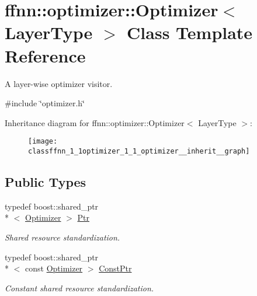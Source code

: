 \hypertarget{classffnn_1_1optimizer_1_1_optimizer}{\section{ffnn\-:\-:optimizer\-:\-:Optimizer$<$ Layer\-Type $>$ Class Template Reference}
\label{classffnn_1_1optimizer_1_1_optimizer}
}


A layer-\/wise optimizer visitor.  




{\ttfamily \#include \char`\"{}optimizer.\-h\char`\"{}}



Inheritance diagram for ffnn\-:\-:optimizer\-:\-:Optimizer$<$ Layer\-Type $>$\-:\nopagebreak
\begin{figure}[H]
\begin{center}
\leavevmode
\texttt{[image: classffnn\_1\_1optimizer\_1\_1\_optimizer\_\_inherit\_\_graph]}
\end{center}
\end{figure}
\subsection*{Public Types}
\begin{DoxyCompactItemize}
\item 
typedef boost\-::shared\-\_\-ptr\\*
$<$ \hyperlink{classffnn_1_1optimizer_1_1_optimizer}{Optimizer} $>$ \hyperlink{classffnn_1_1optimizer_1_1_optimizer_ac03e7181934bf0c12a97fc67a60484ab}{Ptr}
\begin{DoxyCompactList}\small\item\em Shared resource standardization. \end{DoxyCompactList}\item 
typedef boost\-::shared\-\_\-ptr\\*
$<$ const \hyperlink{classffnn_1_1optimizer_1_1_optimizer}{Optimizer} $>$ \hyperlink{classffnn_1_1optimizer_1_1_optimizer_a5d62c55f6f830e993ffe801fb17a1c3a}{Const\-Ptr}
\begin{DoxyCompactList}\small\item\em Constant shared resource standardization. \end{DoxyCompactList}\end{DoxyCompactItemize}
